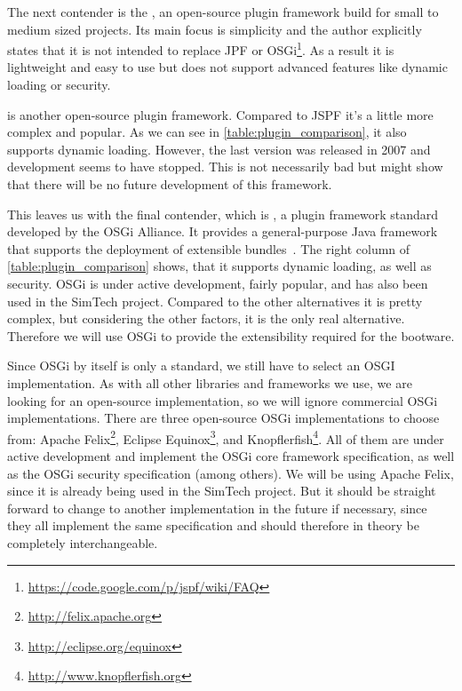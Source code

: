 The next contender is the , an open-source plugin framework build for small to medium sized projects.
Its main focus is simplicity and the author explicitly states that it is not intended to replace JPF or OSGi\footnote{\url{https://code.google.com/p/jspf/wiki/FAQ}}.
As a result it is lightweight and easy to use but does not support advanced features like dynamic loading or security.

 is another open-source plugin framework.
Compared to JSPF it's a little more complex and popular.
As we can see in \autoref{table:plugin_comparison}, it also supports dynamic loading.
However, the last version was released in 2007 and development seems to have stopped.
This is not necessarily bad but might show that there will be no future development of this framework.

This leaves us with the final contender, which is , a plugin framework standard developed by the OSGi Alliance.
It provides a general-purpose Java framework that supports the deployment of extensible bundles~\autocite{osgi:spec}.
The right column of \autoref{table:plugin_comparison} shows, that it supports dynamic loading, as well as security.
OSGi is under active development, fairly popular, and has also been used in the SimTech project.
Compared to the other alternatives it is pretty complex, but considering the other factors, it is the only real alternative.
Therefore we will use OSGi to provide the extensibility required for the bootware.

Since OSGi by itself is only a standard, we still have to select an OSGI implementation.
As with all other libraries and frameworks we use, we are looking for an open-source implementation, so we will ignore commercial OSGi implementations.
There are three open-source OSGi implementations to choose from: Apache Felix\footnote{\url{http://felix.apache.org}}, Eclipse Equinox\footnote{\url{http://eclipse.org/equinox}}, and Knopflerfish\footnote{\url{http://www.knopflerfish.org}}.
All of them are under active development and implement the OSGi core framework specification, as well as the OSGi security specification (among others).
We will be using Apache Felix, since it is already being used in the SimTech project.
But it should be straight forward to change to another implementation in the future if necessary, since they all implement the same specification and should therefore in theory be completely interchangeable.
